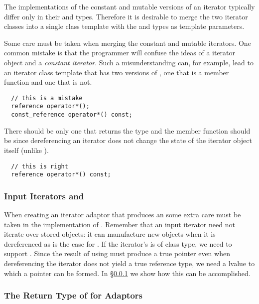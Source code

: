 \documentclass{netobjectdays}
\begin{document}
The implementations of the constant and mutable versions of an
iterator typically differ only in their  and
 types. Therefore it is desirable to merge the two
iterator classes into a single class template with the
 and  types as template parameters.

Some care must be taken when merging the constant and mutable
iterators.  One common mistake is that the programmer will confuse the
ideas of a  iterator object and a \emph{constant
iterator}. Such a misunderstanding can, for example, lead to an
iterator class template that has two versions of , one
that is a  member function and one that is not.
 
{\footnotesize
\begin{verbatim}
  // this is a mistake
  reference operator*();
  const_reference operator*() const;
\end{verbatim}
}

There should be only one  that returns the
 type and the member function should be  since
dereferencing an iterator does not change the state of the iterator
object itself (unlike ).

{\footnotesize
\begin{verbatim}
  // this is right
  reference operator*() const;
\end{verbatim}
}


\subsubsection{Input Iterators and }
\label{sec:operator-arrow}

When creating an iterator adaptor that produces an
 some extra care must be taken in the
implementation of . Remember that an input iterator
need not iterate over stored objects: it can manufacture new objects
when it is dereferenced as is the case for
. If the iterator's  is
of class type, we need to support . Since the result
of using  must produce a true pointer even when
dereferencing the iterator does not yield a true reference type, we
need a  lvalue to which a pointer can be formed.  In
\S\ref{sec:operator-arrow} we show how this can be accomplished.


\subsubsection{The Return Type of  for Adaptors}
\label{sec:operator-bracket}
\end{document}
